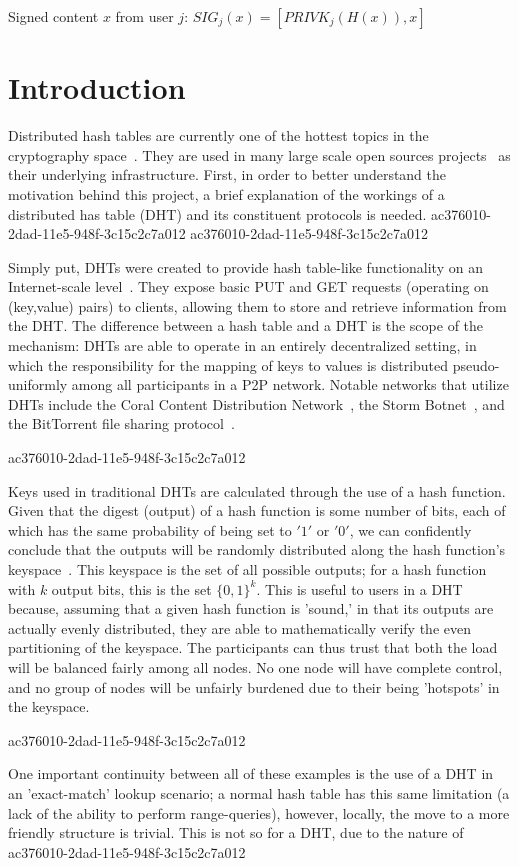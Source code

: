 \documentclass[12pt]{article}
\begin{document}
Signed content $x$ from user $j$: $SIG_j(x) = \left[ PRIVK_j( H(x) ), x \right]$

\section{Introduction}
\par Distributed hash tables are currently one of the hottest topics in the cryptography space~\cite{Stoica:2001dj,Rowstron:2001ea,Ratnasamy:2001wn}. They are used in many large scale open sources projects~\cite{Freitas:2013tb,Xu:2010vs,Perfitt:2010fh} as their underlying infrastructure. First, in order to better understand the motivation behind this project, a brief explanation of the workings of a distributed has table (DHT) and its constituent protocols is needed.
ac376010-2dad-11e5-948f-3c15c2c7a012
ac376010-2dad-11e5-948f-3c15c2c7a012\par Simply put, DHTs were created to provide hash table-like functionality on an Internet-scale level~\cite{Ratnasamy:2001wn}. They expose basic PUT and GET requests (operating on (key,value) pairs) to clients, allowing them to store and retrieve information from the DHT. The difference between a hash table and a DHT is the scope of the mechanism: DHTs are able to operate in an entirely decentralized setting, in which the responsibility for the mapping of keys to values is distributed pseudo-uniformly among all participants in a P2P network. Notable networks that utilize DHTs include the Coral Content Distribution Network~\cite{Freedman:2004vb}, the Storm Botnet~\cite{Holz:2008uk}, and the BitTorrent file sharing protocol~\cite{Cohen:y1_8mBnw}.

ac376010-2dad-11e5-948f-3c15c2c7a012\par Keys used in traditional DHTs are calculated through the use of a hash function. Given that the digest (output) of a hash function is some number of bits, each of which has the same probability of being set to $'1'$ or $'0'$, we can confidently conclude that the outputs will be randomly distributed along the hash function's keyspace~. This keyspace is the set of all possible outputs; for a hash function with $k$ output bits, this is the set $\{0,1\}^k$. This is useful to users in a DHT because, assuming that a given hash function is 'sound,' in that its outputs are actually evenly distributed, they are able to mathematically verify the even partitioning of the keyspace. The participants can thus trust that both the load will be balanced fairly among all nodes. No one node will have complete control, and no group of nodes will be unfairly burdened due to their being 'hotspots' in the keyspace.~

ac376010-2dad-11e5-948f-3c15c2c7a012\par One important continuity between all of these examples is the use of a DHT in an 'exact-match' lookup scenario; a normal hash table has this same limitation (a lack of the ability to perform range-queries), however, locally, the move to a more friendly structure is trivial. This is not so for a DHT, due to the nature of
ac376010-2dad-11e5-948f-3c15c2c7a012\printbibliography
\end{document}

